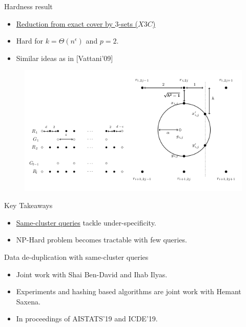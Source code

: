 \documentclass{beamer}
\begin{document}
\begin{frame}[label=queryNegative]{Hardness result}
	\begin{itemize}
		\item \hyperlink{resultQueryNegative}{Reduction from exact cover by $3$-sets ($X3C$)}
		\item Hard for $k = \Theta(n^\epsilon)$ and $p = 2$.
		\item Similar ideas as in \alert{[Vattani'09]}
	\end{itemize}
	
	\begin{figure}
		\centering
		\includegraphics[trim=0 0 0 0,scale=0.5]{figures/hardnessFig.png}
	\end{figure}
\end{frame}

\begin{frame}[label=queryTakeaways]{Key Takeaways}
	
	\begin{itemize}
		\item \hyperlink{notesQueryTakeaways}{Same-cluster queries} tackle under-specificity.
		\vspace{30pt}\item NP-Hard problem becomes {\color{blue}tractable with few queries}. 
	\end{itemize}
\end{frame}


\begin{frame}{Data de-duplication with same-cluster queries}
	\begin{itemize}
		\item Joint work with Shai Ben-David and Ihab Ilyas.
		\vspace{20pt}\item Experiments and hashing based algorithms are joint work with Hemant Saxena.		
		\vspace{20pt} \item In proceedings of \alert{AISTATS'19} and \alert{ICDE'19}.
	\end{itemize}
\end{frame}
\end{document}
